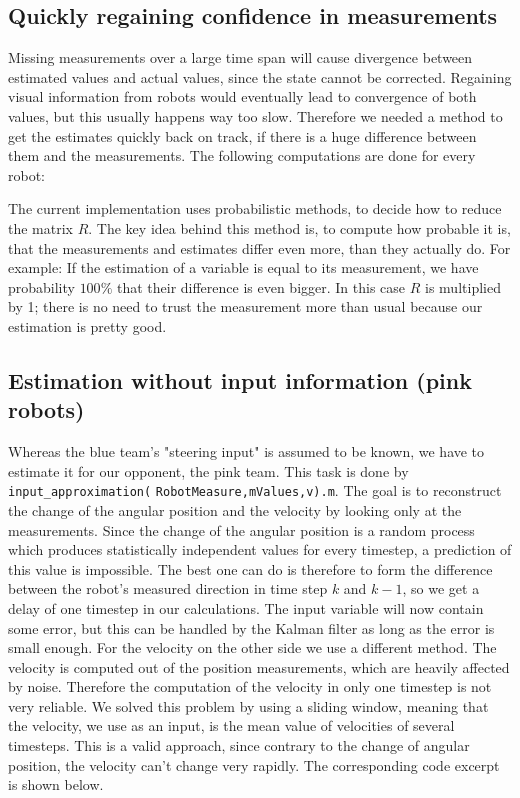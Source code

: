 \subsection{Quickly regaining confidence in measurements}
Missing measurements  over a large time span will cause divergence between estimated values and actual values, since the state cannot be corrected. Regaining visual information from robots would eventually lead to convergence of both values, but this usually happens way too slow. Therefore we needed a method to get the estimates quickly back on track, if there is a huge difference between them and the measurements. The following computations are done for every robot:



The current implementation uses probabilistic methods, to decide how to reduce the matrix \(R\). The key idea behind this method is, to compute how probable it is, that the measurements and estimates differ even more, than they actually do. For example: If the estimation of a variable is equal to its measurement, we have probability \(100\%\) that their difference is even bigger. In this case \(R\) is multiplied by 1; there is no need to trust the measurement more than usual because our estimation is pretty good.

\subsection{Estimation without input information (pink robots)}
Whereas the blue team's "steering input" is assumed to be known, we have to estimate it for our opponent, the pink team. This task is done by \texttt{input\_approximation(} \texttt{RobotMeasure,mValues,v).m}. The goal is to reconstruct the change of the angular position and the velocity by looking only at the measurements. Since the change of the angular position is a random process which produces statistically independent values for every timestep, a prediction of this value is impossible. The best one can do is therefore to form the difference between the robot's measured direction in time step \(k\) and \(k-1\), so we get a delay of one timestep in our calculations. The input variable will now contain some error, but this can be handled by the Kalman filter as long as the error is small enough. For the velocity on the other side we use a different method. The velocity is computed out of the position measurements, which are heavily affected by noise. Therefore the computation of the velocity in only one timestep is not very reliable. We solved this problem by using a sliding window, meaning that the velocity, we use as an input, is the mean value of velocities of several timesteps. This is a valid approach, since contrary to the change of angular position, the velocity can't change very rapidly. The corresponding code excerpt is shown below.

